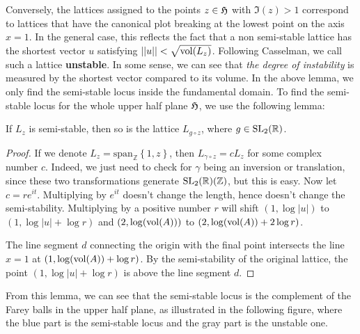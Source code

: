 Conversely, the lattices assigned to the points $z \in \operatorname{\mathfrak{H}}$ with $\Im(z)>1$ correspond to lattices
that have the canonical plot breaking at the lowest point on the axis $x=1$. In the general case, this reflects the fact that
a non semi-stable lattice has the shortest vector $u$ satisfying $||u||<\sqrt{\operatorname{vol}(L_z)}$. Following Casselman,
we call such a lattice \textbf{unstable}. In some sense, we can see that \textit{the degree of instability} is measured
by the shortest vector compared to its volume. In the above lemma, we only find the semi-stable locus inside the fundamental domain.
To find the semi-stable locus for the whole upper half plane $\operatorname{\mathfrak{H}}$, we use the following lemma:
\begin{lemma}
  If $L_z$ is semi-stable, then so is the lattice $L_{g \circ z}$, where $g \in \SL2$.
\end{lemma}
\begin{proof}
  If we denote $L_z=\text{span}_\mathbb{Z}\left\lbrace 1,z\right\rbrace$, then $L_{\gamma\circ z} = cL_z$ for some complex number $c$.
  Indeed, we just need to check for $\gamma$ being an inversion or translation, since these two transformations generate $\SL2(\mathbb{Z})$, but this is easy.
  Now let $c = re^{it}$. Multiplying by $e^{it}$ doesn't change the length, hence doesn't change the semi-stability. Multiplying by a positive number
  $r$ will shift $(1,\log|u|)$ to $(1,\log|u|+\log r)$ and $(2,\log(\operatorname{vol}(A)))$ to $(2,\log(\operatorname{vol}(A))+2\log r)$.


  The line segment $d$ connecting the origin with the final point intersects the line $x=1$ at $(1,\log(\operatorname{vol}(A))+\log r)$. By the semi-stability of the original lattice,
  the point $(1,\log|u|+\log r)$ is above the line segment $d$.
\end{proof}
From this lemma, we can see that the semi-stable locus is the complement of the Farey balls in the upper half plane, as illustrated in the
following figure, where the blue part is the semi-stable locus and the gray part is the unstable one.
